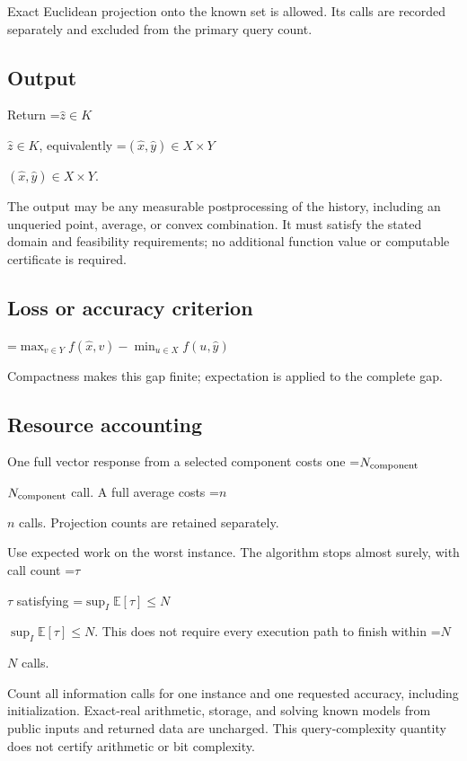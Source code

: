 \documentclass[10pt,a4paper]{article}
\newcommand{\AtlasMath}[1]{\par\begingroup\centering\setbox0=\hbox{$\displaystyle #1$}\ifdim\wd0>1.4\linewidth\typeout{ATLAS WIDE FORMULA: \the\wd0}\fi\ifdim\wd0>\linewidth\resizebox{\linewidth}{!}{\box0}\else\box0\fi\par\endgroup}
\newcommand{\AtlasInlineMath}[1]{\begingroup\setbox0=\hbox{$#1$}\ifdim\wd0>.4\linewidth\endgroup\AtlasMath{#1}\else\endgroup$#1$\fi}
\begin{document}
Exact Euclidean projection onto the known set is allowed. Its calls are recorded separately and excluded from the primary query count.



\subsection{Output}


Return \AtlasInlineMath{\widehat{z}\in K}, equivalently \AtlasInlineMath{(\widehat{x},\widehat{y})\in X\times Y}.



The output may be any measurable postprocessing of the history, including an unqueried point, average, or convex combination. It must satisfy the stated domain and feasibility requirements; no additional function value or computable certificate is required.



\subsection{Loss or accuracy criterion}



\AtlasMath{\max_{v\in Y}f(\widehat{x},v)-\min_{u\in X}f(u,\widehat{y})}




Compactness makes this gap finite; expectation is applied to the complete gap.



\subsection{Resource accounting}


One full vector response from a selected component costs one \AtlasInlineMath{N_{\rm component}} call. A full average costs \AtlasInlineMath{n} calls. Projection counts are retained separately.



Use expected work on the worst instance. The algorithm stops almost surely, with call count \AtlasInlineMath{\tau} satisfying \AtlasInlineMath{\sup_I\mathbb{E}[\tau]\le N}. This does not require every execution path to finish within \AtlasInlineMath{N} calls.



Count all information calls for one instance and one requested accuracy, including initialization. Exact-real arithmetic, storage, and solving known models from public inputs and returned data are uncharged. This query-complexity quantity does not certify arithmetic or bit complexity.
\end{document}
